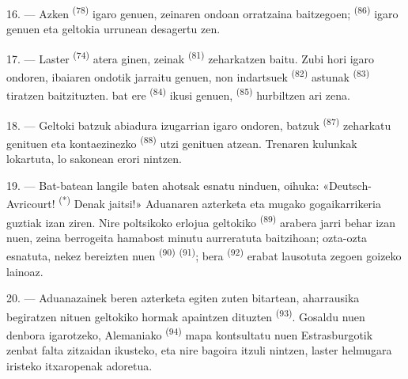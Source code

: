 16. --- Azken  \textsuperscript{(78)} igaro genuen, zeinaren
ondoan orratzaina baitzegoen;  \textsuperscript{(86)} igaro
genuen eta geltokia urrunean desagertu zen.

17. --- Laster  \textsuperscript{(74)} atera ginen,
zeinak  \textsuperscript{(81)} zeharkatzen baitu. Zubi hori igaro
ondoren, ibaiaren ondotik jarraitu genuen, non  indartsuek
\textsuperscript{(82)}  astunak \textsuperscript{(83)}
tiratzen baitzituzten.  bat ere \textsuperscript{(84)}
ikusi genuen,  \textsuperscript{(85)} hurbiltzen ari
zena.

18. --- Geltoki batzuk abiadura izugarrian igaro ondoren, 
batzuk \textsuperscript{(87)} zeharkatu genituen eta 
kontaezinezko  \textsuperscript{(88)} utzi genituen atzean.
Trenaren kulunkak lokartuta, lo sakonean erori nintzen.

\VUsaut{3.0mm}
\VUsaut{3.0mm}

19. --- Bat-batean langile baten ahotsak esnatu ninduen, oihuka:
«Deutsch-Avricourt! \textsuperscript{(*)} Denak jaitsi!» Aduanaren azterketa eta
mugako gogaikarrikeria guztiak izan ziren. Nire poltsikoko erlojua geltokiko
 \textsuperscript{(89)} arabera jarri behar izan nuen,
zeina berrogeita hamabost minutu aurreratuta baitzihoan; ozta-ozta esnatuta,
nekez bereizten nuen  \textsuperscript{(90)}
 \textsuperscript{(91)};  bera
\textsuperscript{(92)} erabat lausotuta zegoen goizeko lainoaz.

20. --- Aduanazainek beren azterketa egiten zuten bitartean, aharrausika
begiratzen nituen geltokiko hormak apaintzen dituzten 
\textsuperscript{(93)}. Gosaldu nuen denbora igarotzeko, Alemaniako
 \textsuperscript{(94)} mapa kontsultatu nuen Estrasburgotik
zenbat falta zitzaidan ikusteko, eta nire bagoira itzuli nintzen, laster helmugara
iristeko itxaropenak adoretua.
\VUsaut{6.0mm}
\VUfilet{22mm}
